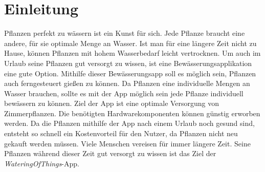 \section{Einleitung}
Pflanzen perfekt zu wässern ist ein Kunst für sich. Jede Pflanze braucht eine andere, für sie optimale Menge an Wasser. Ist man für eine längere Zeit nicht zu Hause, können Pflanzen mit hohem Wasserbedarf leicht vertrocknen. Um auch im Urlaub seine Pflanzen gut versorgt zu wissen, ist eine Bewässerungsapplikation eine gute Option. Mithilfe dieser Bewässerungsapp soll es möglich sein, Pflanzen auch ferngesteuert gießen zu können. Da Pflanzen eine individuelle Mengen an Wasser brauchen, sollte es mit der App möglich sein jede Pflanze individuell bewässern zu können. Ziel der App ist eine optimale Versorgung von Zimmerpflanzen. Die benötigten Hardwarekomponenten können günstig erworben werden. Da die Pflanzen mithilfe der App nach einem Urlaub noch gesund sind, entsteht so schnell ein Kostenvorteil für den Nutzer, da Pflanzen nicht neu gekauft werden müssen. Viele Menschen vereisen für immer längere Zeit. Seine Pflanzen während dieser Zeit gut versorgt zu wissen ist das Ziel der \textit{WateringOfThings}-App.